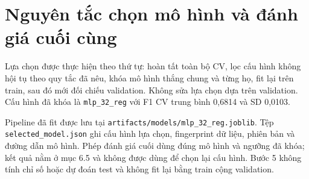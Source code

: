\section{Nguyên tắc chọn mô hình và đánh giá cuối cùng}
\label{sec:5_8}
Lựa chọn được thực hiện theo thứ tự: hoàn tất toàn bộ CV, lọc cấu hình không hội tụ theo quy tắc đã nêu, khóa mô hình thắng chung và từng họ, fit lại trên train, sau đó mới đối chiếu validation. Không sửa lựa chọn dựa trên validation. Cấu hình đã khóa là \texttt{mlp\_32\_reg} với F1 CV trung bình 0,6814 và SD 0,0103.

Pipeline đã fit được lưu tại \texttt{artifacts/models/mlp\_32\_reg.joblib}. Tệp \texttt{selected\_model.json} ghi cấu hình lựa chọn, fingerprint dữ liệu, phiên bản và đường dẫn mô hình. Phép đánh giá cuối dùng đúng mô hình và ngưỡng đã khóa; kết quả nằm ở mục 6.5 và không được dùng để chọn lại cấu hình. Bước 5 không tính chỉ số hoặc dự đoán test và không fit lại bằng train cộng validation.
